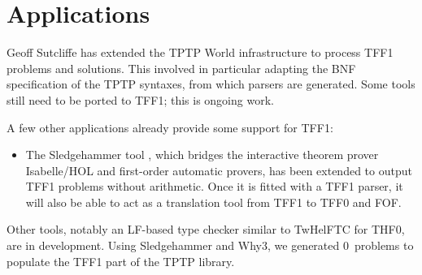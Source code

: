 \section{Applications}
\label{sec_apps}

Geoff Sutcliffe has extended the TPTP World infrastructure to process TFF1
problems and solutions. This involved in particular adapting the BNF
specification of the TPTP syntaxes, from which parsers are generated. Some tools
still need to be ported to TFF1; this is ongoing work.

A few other applications already provide some support for TFF1:
%
\begin{itemize}

\item The Sledgehammer tool \cite{paulson-blanchette-2010}, which bridges the
interactive theorem prover Isabelle\slash HOL and first-order automatic provers,
has been extended to output TFF1 problems without arithmetic. Once it is fitted
with a TFF1 parser, it will also be able to act as a translation tool from TFF1
to TFF0 and FOF.

\end{itemize}

Other tools, notably an LF-based type checker similar to TwHelFTC for THF0,
are in development.
%
Using Sledgehammer and Why3, we generated 0~problems to populate the TFF1
part of the TPTP library.

%
%
%
%

